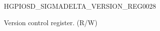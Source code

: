 \begin{register}{H}{GPIOSD\_SIGMADELTA\_VERSION\_REG}{\hexprefix{}0028}\label{regdesc:GPIOSDSIGMADELTAVERSIONREG}
%
%
\regnewline%
\begin{regdesc}\begin{reglist}
\label{fielddesc:GPIOSDGPIOSDDATE}\item [GPIOSD\_GPIO\_SD\_DATE] Version control register. (R/W)
\end{reglist}\end{regdesc}
\end{register}
